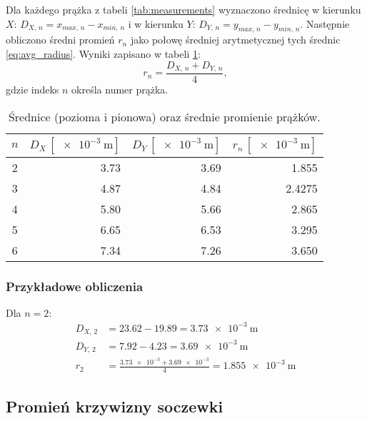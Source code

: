 \documentclass[a4paper,12pt]{article}
\begin{document}
Dla każdego prążka z tabeli \ref{tab:measurements} wyznaczono średnicę w kierunku $X$: $D_{X,\,n} = x_{max,\,n} - x_{min,\,n}$ i w kierunku $Y$: $D_{Y,\,n} = y_{max,\,n} - y_{min,\,n}$. Następnie obliczono średni promień $r_{n}$ jako połowę średniej arytmetycznej tych średnic \eqref{eq:avg_radius}. Wyniki zapisano w tabeli \ref{tab:radii}:
\begin{equation}
    \label{eq:avg_radius}
    r_{n} = \frac{D_{X,\,n} + D_{Y,\,n}}{4},
\end{equation}
gdzie indeks $n$ określa numer prążka.

\begin{table}[H]
    \centering
    \begin{tabular}{|c|r|r|r|}
        \hline
        \textbf{$n$} & \textbf{$D_{X}\,[\SI{e-3}{\meter}]$} & \textbf{$D_{Y}\,[\SI{e-3}{\meter}]$} & \textbf{$r_{n}\,[\SI{e-3}{\meter}]$} \\
        \hline
        \num{2} & \num{3.73} & \num{3.69} & \num{1.855} \\ \hline
        \num{3} & \num{4.87} & \num{4.84} & \num{2.4275} \\ \hline
        \num{4} & \num{5.80} & \num{5.66} & \num{2.865} \\ \hline
        \num{5} & \num{6.65} & \num{6.53} & \num{3.295} \\ \hline
        \num{6} & \num{7.34} & \num{7.26} & \num{3.650} \\ \hline
    \end{tabular}
    \caption{Średnice (pozioma i pionowa) oraz średnie promienie prążków.}
    \label{tab:radii}
\end{table}


\subsubsection*{Przykładowe obliczenia}
Dla $n=2$:
\begin{align*}
    D_{X,\,2} & = \num{23.62} - \num{19.89} = \SI{3.73e-3}{\meter}                \\
    D_{Y,\,2} & = \num{7.92} - \num{4.23} = \SI{3.69e-3}{\meter}                  \\
    r_{2}     & = \frac{\num{3.73e-3} + \num{3.69e-3}}{4} = \SI{1.855e-3}{\meter}
\end{align*}

\subsection{Promień krzywizny soczewki}
\end{document}

